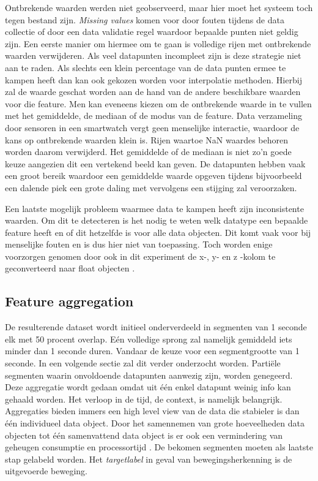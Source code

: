 Ontbrekende waarden werden niet geobserveerd, maar hier moet het systeem toch tegen bestand zijn. \textit{Missing values} komen voor door fouten tijdens de data collectie of door een data validatie regel waardoor bepaalde punten niet geldig zijn. Een eerste manier om hiermee om te gaan is volledige rijen met ontbrekende waarden verwijderen. Als veel datapunten incompleet zijn is deze strategie niet aan te raden. Als slechts een klein percentage van de data punten ermee te kampen heeft dan kan ook gekozen worden voor interpolatie methoden. Hierbij zal de waarde geschat worden aan de hand van de andere beschikbare waarden voor die feature. Men kan eveneens kiezen om de ontbrekende waarde in te vullen met het gemiddelde, de mediaan of de modus van de feature. Data verzameling door sensoren in een smartwatch vergt geen menselijke interactie, waardoor de kans op ontbrekende waarden klein is. Rijen waartoe NaN waardes behoren worden daarom verwijderd. Het gemiddelde of de mediaan is niet zo'n goede keuze aangezien dit een vertekend beeld kan geven. De datapunten hebben vaak een groot bereik waardoor een gemiddelde waarde opgeven tijdens bijvoorbeeld een dalende piek een grote daling met vervolgens een stijging zal veroorzaken.

Een laatste mogelijk probleem waarmee data te kampen heeft zijn inconsistente waarden. Om dit te detecteren is het nodig te weten welk datatype een bepaalde feature heeft en of dit hetzelfde is voor alle data objecten. Dit komt vaak voor bij menselijke fouten en is dus hier niet van toepassing. Toch worden enige voorzorgen genomen door ook in dit experiment de x-, y- en z -kolom te geconverteerd naar float objecten \cite{ref69}.

\subsection{Feature aggregation}
De resulterende dataset wordt initieel onderverdeeld in segmenten van 1 seconde elk met 50 procent overlap. Eén volledige sprong zal namelijk gemiddeld iets minder dan 1 seconde duren. Vandaar de keuze voor een segmentgrootte van 1 seconde. In een volgende sectie zal dit verder onderzocht worden. Partiële segmenten waarin onvoldoende datapunten aanwezig zijn, worden genegeerd.
Deze aggregatie wordt gedaan omdat uit één enkel datapunt weinig info kan gehaald worden. Het verloop in de tijd, de context, is namelijk belangrijk. Aggregaties bieden immers een high level view van de data die stabieler is dan één individueel data object. Door het samennemen van grote hoeveelheden data objecten tot één samenvattend data object is er ook een vermindering van geheugen consumptie en processortijd \cite{ref69}. 
De bekomen segmenten moeten als laatste stap gelabeld worden. Het \textit{targetlabel} in geval van bewegingsherkenning is de uitgevoerde beweging. 

